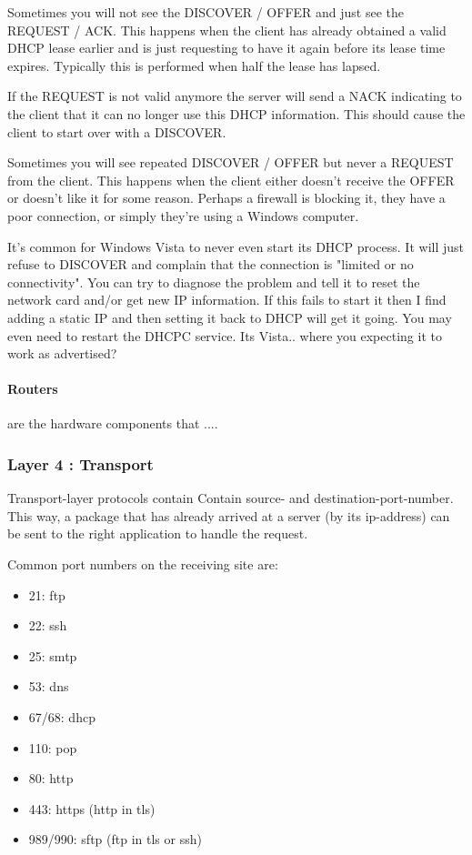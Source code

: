 Sometimes you will not see the DISCOVER / OFFER and just see the REQUEST / ACK. This happens when the client has already obtained a valid DHCP lease earlier and is just requesting to have it again before its lease time expires. Typically this is performed when half the lease has lapsed.

If the REQUEST is not valid anymore the server will send a NACK indicating to the client that it can no longer use this DHCP information. This should cause the client to start over with a DISCOVER.

Sometimes you will see repeated DISCOVER / OFFER but never a REQUEST from the client. This happens when the client either doesn't receive the OFFER or doesn't like it for some reason. Perhaps a firewall is blocking it, they have a poor connection, or simply they're using a Windows computer.

It's common for Windows Vista to never even start its DHCP process. It will just refuse to DISCOVER and complain that the connection is "limited or no connectivity".  You can try to diagnose the problem and tell it to reset the network card and/or get new IP information. If this fails to start it then I find adding a static IP and then setting it back to DHCP will get it going. You may even need to restart the DHCPC service. Its Vista.. where you expecting it to work as advertised?


\paragraph{Routers} are the hardware components that ....


\subsubsection{Layer 4 : Transport}

Transport-layer protocols contain Contain source- and destination-port-number. This way, a package that has already arrived at a server (by its ip-address) can be sent to the right application to handle the request. 

Common port numbers on the receiving site are:
\begin{itemize}
\item 21: ftp
\item 22: ssh
\item 25: smtp
\item 53: dns
\item 67/68: dhcp
\item 110: pop
\item 80: http
\item 443: https (http in tls)
\item 989/990: sftp (ftp in tls or ssh)
\end{itemize}

